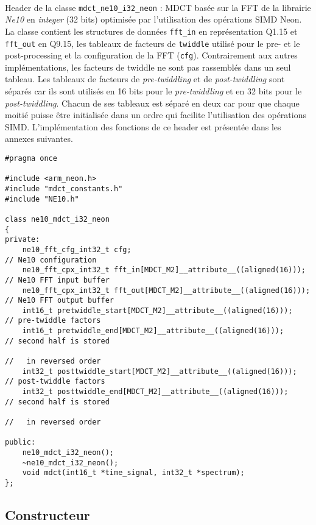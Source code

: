 \documentclass{article}
\begin{document}
\paragraph{}
Header de la classe \texttt{mdct\_ne10\_i32\_neon} : MDCT basée sur la FFT de la librairie \emph{Ne10} en \emph{integer} (32 bits) optimisée par l'utilisation des opérations SIMD Neon. La classe contient les structures de données \texttt{fft\_in} en représentation Q1.15 et \texttt{fft\_out} en Q9.15, les tableaux de facteurs de \texttt{twiddle} utilisé pour le pre- et le post-processing et la configuration de la FFT (\texttt{cfg}). Contrairement aux autres implémentations, les facteurs de twiddle ne sont pas rassemblés dans un seul tableau. Les tableaux de facteurs de \emph{pre-twiddling} et de \emph{post-twiddling} sont séparés car ils sont utilisés en 16 bits pour le \emph{pre-twiddling} et en 32 bits pour le \emph{post-twiddling}. Chacun de ses tableaux est séparé en deux car pour que chaque moitié puisse être initialisée dans un ordre qui facilite l'utilisation des opérations SIMD. L'implémentation des fonctions de ce header est présentée dans les annexes suivantes.
\lstset{language=C++}
\begin{lstlisting}
#pragma once

#include <arm_neon.h>
#include "mdct_constants.h"
#include "NE10.h"

class ne10_mdct_i32_neon
{
private:
    ne10_fft_cfg_int32_t cfg;                                          // Ne10 configuration
    ne10_fft_cpx_int32_t fft_in[MDCT_M2]__attribute__((aligned(16)));  // Ne10 FFT input buffer
    ne10_fft_cpx_int32_t fft_out[MDCT_M2]__attribute__((aligned(16))); // Ne10 FFT output buffer
    int16_t pretwiddle_start[MDCT_M2]__attribute__((aligned(16)));     // pre-twiddle factors
    int16_t pretwiddle_end[MDCT_M2]__attribute__((aligned(16)));       // second half is stored
                                                                       //   in reversed order
    int32_t posttwiddle_start[MDCT_M2]__attribute__((aligned(16)));    // post-twiddle factors
    int32_t posttwiddle_end[MDCT_M2]__attribute__((aligned(16)));      // second half is stored
                                                                       //   in reversed order

public:
    ne10_mdct_i32_neon();
    ~ne10_mdct_i32_neon();
    void mdct(int16_t *time_signal, int32_t *spectrum);
};
\end{lstlisting}

\subsection{Constructeur}\label{app:mdct_ne10_i32_neon_constructor}
\end{document}
